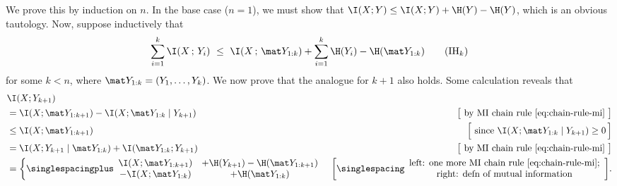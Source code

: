 \begin{subappendices}
\begin{lproof}
    We prove this by induction on $n$. In the base case ($n=1$), 
    we must show that $\I(X;Y)  \le \I(X;Y) + \H(Y) - \H(Y)$, which is an obvious tautology. 
    Now, suppose inductively that 
    \[
        \sum_{i=1}^k \I(X\,;\,Y_i) 
        ~\le~
         \I(X \,;\, \mat Y_{1:k}) + \sum_{i=1}^k \H(Y_i) - \H(\mat Y_{1:k})
         \tag{IH$_k$}
    \]
    for some $k < n$, where $\mat Y_{1:k} = (Y_1, \ldots, Y_k)$. 
    We now prove that the analogue for $k+1$ also holds. 
    Some calculation reveals that
    \begin{align*}
        &\I(X ; Y_{k+1}) \\
        &= \I(X ; \mat Y_{1:k+1}) - \I(X ; \mat Y_{1:k} \mid Y_{k+1}) 
            & \big[\text{ by MI chain rule \eqref{eq:chain-rule-mi} } \big]
        \\
            &\le \I(X ; \mat Y_{1:k+1})
            & \Big[\text{ since } \I(X ; \mat Y_{1:k} \mid Y_{k+1}) \ge 0\, \Big] \\
        &= \I(X;  Y_{k+1} \mid \mat Y_{1:k}) + \I(\mat Y_{1:k} ;  Y_{k+1})
            & \big[\text{ by MI chain rule \eqref{eq:chain-rule-mi} } \big] \\
        &= \left\{
        {\singlespacingplus\begin{array}{cc}
        \I(X ; \mat Y_{1:k+1})  & + \H(Y_{k+1}) - \H( \mat Y_{1:k+1}) \\
         - \I(X ; \mat Y_{1:k})  & + \H( \mat Y_{1:k} )           
        \end{array}}
        \right.
        & \!\bigg[
        {\singlespacing
        \begin{array}{c}
        \text{left: one more MI chain rule \eqref{eq:chain-rule-mi};} \\
        \text{right: defn of mutual information}    
        \end{array}%
        }%
        \bigg].
    \end{align*}
    

\end{lproof}
\end{subappendices}
